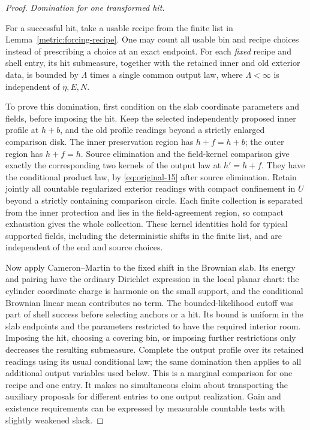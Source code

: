 \begin{proof}
\smallskip\noindent\emph{Domination for one transformed hit.}\par
For a successful hit, take a usable recipe from the finite list in
Lemma~\ref{metric:forcing-recipe}. One may count all usable bin and recipe
choices instead of prescribing a choice at an exact endpoint. For each
\emph{fixed} recipe and shell entry, its hit submeasure, together with the
retained inner and old exterior data, is bounded by $\Lambda$ times a
single common output law, where $\Lambda<\infty$ is independent of
$\eta,E,N$.

To prove this domination, first condition on the slab coordinate parameters
and fields, before imposing the hit. Keep the selected independently
proposed inner profile at $h+b$, and the old profile readings beyond a
strictly enlarged comparison disk. The inner preservation region has
$h+f=h+b$; the outer region has $h+f=h$. Source elimination and the
field-kernel comparison give exactly the corresponding two kernels of
the output law at $h'=h+f$. They have the conditional product law, by
\eqref{eq:original-15} after source elimination. Retain jointly all
countable regularized exterior readings with compact confinement in $U$
beyond a strictly containing comparison circle. Each finite collection
is separated from the inner protection and lies in the field-agreement
region, so compact exhaustion gives the whole collection. These kernel
identities hold for typical supported fields, including the deterministic
shifts in the finite list, and are independent of the end and source
choices.

Now apply Cameron--Martin to the fixed shift in the Brownian slab. Its
energy and pairing have the ordinary Dirichlet expression in the local
planar chart: the cylinder coordinate charge is harmonic on the small
support, and the conditional Brownian linear mean contributes no term.
The bounded-likelihood cutoff was part of shell success before selecting
anchors or a hit. Its bound is uniform in the slab endpoints and the
parameters restricted to have the required interior room. Imposing the
hit, choosing a covering bin, or imposing further restrictions only
decreases the resulting submeasure. Complete the output profile over its
retained readings using its usual conditional law; the same domination
then applies to all additional output variables used below. This is a
marginal comparison for one recipe and one entry. It makes no simultaneous
claim about transporting the auxiliary proposals for different entries
to one output realization. Gain and existence requirements can be
expressed by measurable countable tests with slightly weakened slack.


\end{proof}
